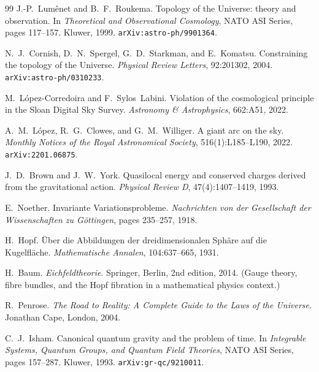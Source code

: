 \documentclass[12pt,a4paper]{article}
\theoremstyle{definition}
\begin{document}
\begin{thebibliography}{99}
J.-P.~Lum\^{e}net and B.~F.~Roukema.
\newblock Topology of the Universe: theory and observation.
\newblock In \emph{Theoretical and Observational Cosmology}, NATO ASI Series, pages 117--157. Kluwer, 1999.
\newblock \texttt{arXiv:astro-ph/9901364}.

N.~J.~Cornish, D.~N.~Spergel, G.~D.~Starkman, and E.~Komatsu.
\newblock Constraining the topology of the Universe.
\newblock \emph{Physical Review Letters}, 92:201302, 2004.
\newblock \texttt{arXiv:astro-ph/0310233}.

M.~L\'{o}pez-Corredoira and F.~Sylos~Labini.
\newblock Violation of the cosmological principle in the Sloan Digital Sky Survey.
\newblock \emph{Astronomy \& Astrophysics}, 662:A51, 2022.

A.~M.~L\'{o}pez, R.~G.~Clowes, and G.~M.~Williger.
\newblock A giant arc on the sky.
\newblock \emph{Monthly Notices of the Royal Astronomical Society}, 516(1):L185--L190, 2022.
\newblock \texttt{arXiv:2201.06875}.

J.~D.~Brown and J.~W.~York.
\newblock Quasilocal energy and conserved charges derived from the gravitational action.
\newblock \emph{Physical Review D}, 47(4):1407--1419, 1993.

E.~Noether.
\newblock Invariante Variationsprobleme.
\newblock \emph{Nachrichten von der Gesellschaft der Wissenschaften zu G\"{o}ttingen}, pages 235--257, 1918.

H.~Hopf.
\newblock \"{U}ber die Abbildungen der dreidimensionalen Sph\"{a}re auf die Kugelfl\"{a}che.
\newblock \emph{Mathematische Annalen}, 104:637--665, 1931.

H.~Baum.
\newblock \emph{Eichfeldtheorie}.
\newblock Springer, Berlin, 2nd edition, 2014.
\newblock (Gauge theory, fibre bundles, and the Hopf fibration in a mathematical physics context.)

R.~Penrose.
\newblock \emph{The Road to Reality: A Complete Guide to the Laws of the Universe}.
\newblock Jonathan Cape, London, 2004.

C.~J.~Isham.
\newblock Canonical quantum gravity and the problem of time.
\newblock In \emph{Integrable Systems, Quantum Groups, and Quantum Field Theories}, NATO ASI Series, pages 157--287. Kluwer, 1993.
\newblock \texttt{arXiv:gr-qc/9210011}.

\end{thebibliography}
\end{document}
